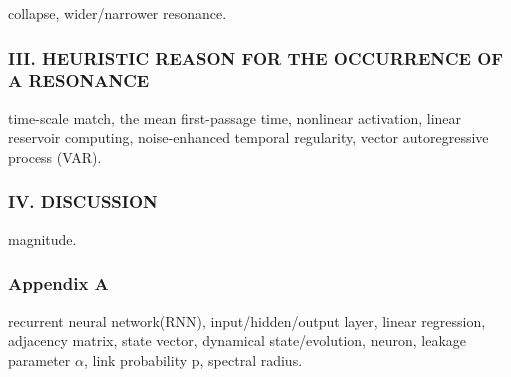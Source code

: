 collapse, wider/narrower resonance.

\subsubsection{III. HEURISTIC REASON FOR THE OCCURRENCE
OF A RESONANCE}

time-scale match, the mean first-passage time, nonlinear activation, linear reservoir computing, noise-enhanced temporal regularity, vector autoregressive process (VAR).

\subsubsection{IV. DISCUSSION}

magnitude.

\subsubsection{Appendix A}

recurrent neural network(RNN), input/hidden/output layer, linear regression, adjacency matrix, state vector, dynamical state/evolution, neuron, leakage parameter $\alpha$, link probability p, spectral radius.
\clearpage